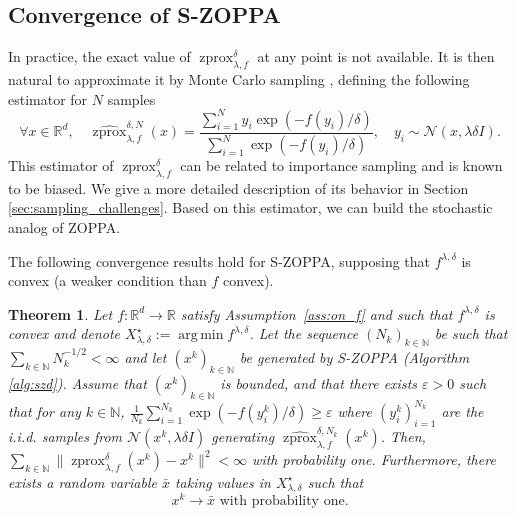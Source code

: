 \documentclass{article}
\newtheorem{theorem}{Theorem}
\newcommand{\R}{\mathbb{R}}
\newcommand{\zprox}{\ensuremath{\operatorname{zprox}}}
\newcommand{\szprox}{\ensuremath{\widehat{\operatorname{zprox}}}}
\DeclareMathOperator*{\argmin}{arg\,min}
\begin{document}
\subsection{Convergence of S-ZOPPA}

In practice, the exact value of \(\zprox^{\delta}_{\lambda, f}\) at any point is not available. It is then natural to approximate it by Monte Carlo sampling \cite{osher2023hamilton,tibshirani2025laplace,luo2025asymptotic,di2026operator,zhang2024inexact,morales2026convergenceratesstochasticproximal}, defining the following estimator for \(N\) samples
\begin{equation}\label{eq:S-ZOPO}
    \forall x\in\R^d,\quad\szprox^{\delta,N}_{\lambda, f}(x)=\frac{\sum_{i=1}^Ny_i\exp(-f(y_i)/\delta)}{\sum_{i=1}^N\exp(-f(y_i)/\delta)},\quad y_i\sim\mathcal{N}\left(x,\lambda\delta I\right).
\end{equation}
This estimator of \(\zprox^{\delta}_{\lambda, f}\) can be related to importance sampling and is known to be biased. We give a more detailed description of its behavior in Section \ref{sec:sampling_challenges}. Based on this estimator, we can build the stochastic analog of ZOPPA.

\begin{algorithm}[H] 
\caption{S-ZOPPA: Stochastic Zeroth-Order Proximal Point Algorithm} \label{alg:szd}
\begin{algorithmic}
  \STATE{{\bf Input:} $x^0 \in \R^d$, $\delta \in \R_{>0}$, $\lambda\in \R_{>0}$, $\left(N_k\right)_{k\in\mathbb{N}}\in \mathbb{N}^\mathbb{N}$}
         \STATE{$x^{k + 1} = \szprox^{\delta,N_k}_{\lambda, f}(x^k)$}
     \ENDFOR
 \end{algorithmic}    
 \end{algorithm}

The following convergence results hold for S-ZOPPA, supposing that $f^{\lambda,\delta}$ is convex (a weaker condition than $f$ convex).

\begin{theorem}\label{thm:S-ZOPPA}
    Let \(f:\mathbb{R}^d\to 
\R\) satisfy Assumption~\ref{ass:on_f} and such that $f^{\lambda,\delta}$ is convex and denote $X^{\star}_{\lambda,\delta}:=\argmin f^{\lambda,\delta}$. Let the sequence \(\left(N_k\right)_{k\in\mathbb{N}}\) be such that \(\sum_{k\in\mathbb{N}}N_k^{-1/2}<\infty\) and let  $\left(x^k\right)_{k\in\mathbb{N}}$ be generated by S-ZOPPA (Algorithm \ref{alg:szd}). Assume that  \(\left(x^k\right)_{k\in\mathbb{N}}\) is bounded, and that there exists \(\varepsilon>0\) such that for any \(k\in\mathbb{N}\), \(\frac{1}{N_k}\sum_{i=1}^{N_k}\exp(-f(y^k_i)/\delta)\ge\varepsilon\) where \(\left(y^k_i\right)_{i=1}^{N_k}\) are the i.i.d. samples from \(\mathcal{N}(x^k,\lambda\delta I)\) generating \(\szprox^{\delta,N_k}_{\lambda, f}(x^k)\).  
Then,      \(\sum_{k\in\mathbb{N}}\|\zprox^{\delta}_{\lambda, f}(x^k)-x^k\|^2<\infty\)
    with probability one. Furthermore, there exists a random variable $\bar{x}$ taking values in $X^{\star}_{\lambda,\delta}$ such that $$x^k \to \bar{x} \text{ with probability one.} $$
\end{theorem}
\end{document}
